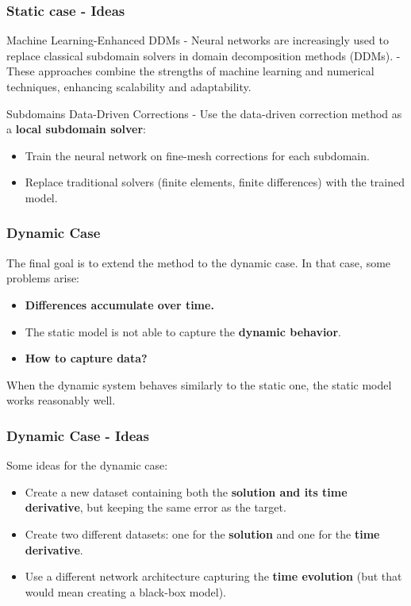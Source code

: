 \documentclass{beamer}
\begin{document}
\begin{frame}

    \frametitle{Static case - Ideas}
    
    \begin{block}{Machine Learning-Enhanced DDMs}
        - Neural networks are increasingly used to replace classical subdomain solvers in domain decomposition methods (DDMs).
        - These approaches combine the strengths of machine learning and numerical techniques, enhancing scalability and adaptability.
    \end{block}
    
    \vspace{0.3cm}
    
    \begin{block}{Subdomains Data-Driven Corrections}
        - Use the data-driven correction method as a \textbf{local subdomain solver}:
        \begin{itemize}
            \item Train the neural network on fine-mesh corrections for each subdomain.
            \item Replace traditional solvers (finite elements, finite differences) with the trained model.
        \end{itemize}
    \end{block}
    
    
    \end{frame}
    

\begin{frame}
    \frametitle{Dynamic Case}
    The final goal is to extend the method to the dynamic case. In that case, some problems arise:
    \begin{itemize}
        \item \textbf{Differences accumulate over time.}
        \item The static model is not able to capture the \textbf{dynamic behavior}.
        \item \textbf{How to capture data?}
    \end{itemize}
    When the dynamic system behaves similarly to the static one, the static model works reasonably well.
\end{frame}

\begin{frame}
    \frametitle{Dynamic Case - Ideas}
    Some ideas for the dynamic case:
    \begin{itemize}
        \item Create a new dataset containing both the \textbf{solution and its time derivative}, but keeping the same error as the target.
        \item Create two different datasets: one for the \textbf{solution} and one for the \textbf{time derivative}.
        \item Use a different network architecture capturing the \textbf{time evolution} (but that would mean creating a black-box model).
    \end{itemize}
\end{frame}
\end{document}

